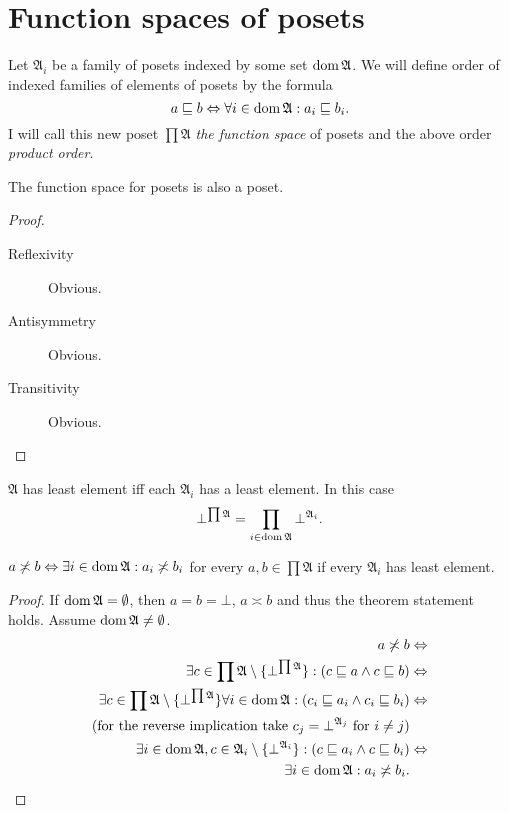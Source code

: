 \section{Function spaces of posets}
\begin{defn}
Let $\mathfrak{A}_{i}$ be a family of posets indexed by some set
$\operatorname{dom}\mathfrak{A}$. We will define order of indexed families of elements of posets by
the formula
\[
a\sqsubseteq b\Leftrightarrow\forall i\in\operatorname{dom}\mathfrak{A}:a_{i}\sqsubseteq b_{i}.
\]
I will call
this new poset $\prod\mathfrak{A}$ \emph{the function
space} of posets and the above order \emph{product order}.\end{defn}
\begin{prop}
The function space for posets is also a poset.\end{prop}
\begin{proof}
~
\begin{description}
\item [{Reflexivity}] Obvious.
\item [{Antisymmetry}] Obvious.
\item [{Transitivity}] Obvious.
\end{description}
\end{proof}
\begin{obvious}
$\mathfrak{A}$ has least element iff each $\mathfrak{A}_{i}$ has
a least element. In this case
\[
\bot^{\prod\mathfrak{A}}=\prod_{i\in\operatorname{dom}\mathfrak{A}}\bot^{\mathfrak{A}_{i}}.
\]
\end{obvious}
\begin{prop}
$a\not\asymp b\Leftrightarrow\exists i\in\operatorname{dom}\mathfrak{A}:a_{i}\not\asymp b_{i}$
for every $a,b\in\prod\mathfrak{A}$ if every $\mathfrak{A}_{i}$
has least element.\end{prop}
\begin{proof}
If $\operatorname{dom}\mathfrak{A}=\emptyset$, then $a=b=\bot$, $a\asymp b$ and
thus the theorem statement holds. Assume $\operatorname{dom}\mathfrak{A}\neq\emptyset$.
\begin{align*}
a\not\asymp b & \Leftrightarrow\\
\exists c\in\prod\mathfrak{A}\setminus\{\bot^{\prod\mathfrak{A}}\}:(c\sqsubseteq a\land c\sqsubseteq b) & \Leftrightarrow\\
\exists c\in\prod\mathfrak{A}\setminus\{\bot^{\prod\mathfrak{A}}\}\forall i\in\operatorname{dom}\mathfrak{A}:(c_{i}\sqsubseteq a_{i}\land c_{i}\sqsubseteq b_{i}) & \Leftrightarrow\\
\text{(for the reverse implication take \ensuremath{c_{j}=\bot^{\mathfrak{A}_{j}}} for \ensuremath{i\ne j})}\\
\exists i\in\operatorname{dom}\mathfrak{A},c\in\mathfrak{A}_{i}\setminus\{\bot^{\mathfrak{A}_{i}}\}:(c\sqsubseteq a_{i}\land c\sqsubseteq b_{i}) & \Leftrightarrow\\
\exists i\in\operatorname{dom}\mathfrak{A}:a_{i}\not\asymp b_{i}.
\end{align*}
\end{proof}
